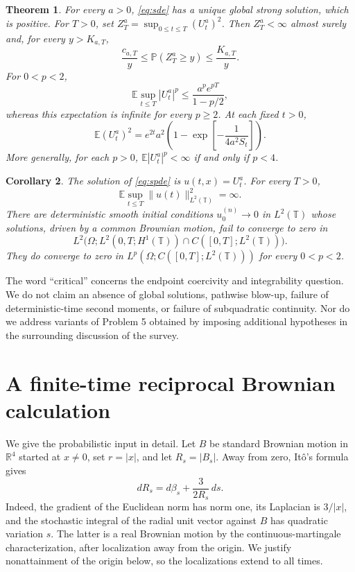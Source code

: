 \documentclass[11pt]{article}
\newtheorem{theorem}{Theorem}[section]
\newtheorem{corollary}[theorem]{Corollary}
\theoremstyle{remark}\newtheorem{remark}[theorem]{Remark}
\newcommand{\E}{\mathbb E}\newcommand{\Pp}{\mathbb P}
\newcommand{\R}{\mathbb R}\newcommand{\T}{\mathbb T}
\begin{document}
\begin{theorem}\label{thm:main}
For every $a>0$, \eqref{eq:sde} has a unique global strong solution, which is positive. For $T>0$, set $Z_T^a=\sup_{0\le t\le T}(U_t^a)^2$. Then $Z_T^a<\infty$ almost surely and, for every $y>K_{a,T}$,
\begin{equation}\label{eq:tail}
 \frac{c_{a,T}}{y}\le \Pp(Z_T^a\ge y)\le \frac{K_{a,T}}{y}.
\end{equation}
For $0<p<2$,
\begin{equation}\label{eq:subcritical}
 \E\sup_{t\le T}|U_t^a|^p\le
 \frac{a^p e^{pT}}{1-p/2},
\end{equation}
whereas this expectation is infinite for every $p\ge2$. At each fixed $t>0$,
\begin{equation}\label{eq:second}
 \E (U_t^a)^2=e^{2t}a^2
 \left(1-\exp\left[-\frac{1}{4a^2S_t}\right]\right).
\end{equation}
More generally, for each $p>0$, $\E|U_t^a|^p<\infty$ if and only if $p<4$.
\end{theorem}

\begin{corollary}\label{cor:spde}
The solution of \eqref{eq:spde} is $u(t,x)=U_t^a$. For every $T>0$,
\[
 \E\sup_{t\le T}\|u(t)\|_{L^2(\T)}^2=\infty.
\]
There are deterministic smooth initial conditions $u_0^{(n)}\to0$ in $L^2(\T)$ whose solutions, driven by a common Brownian motion, fail to converge to zero in
\[
 L^2\bigl(\Omega;L^2(0,T;H^1(\T))\cap C([0,T];L^2(\T))\bigr).
\]
They do converge to zero in $L^p(\Omega;C([0,T];L^2(\T)))$ for every $0<p<2$.
\end{corollary}

The word ``critical'' concerns the endpoint coercivity and integrability question. We do not claim an absence of global solutions, pathwise blow-up, failure of deterministic-time second moments, or failure of subquadratic continuity. Nor do we address variants of Problem 5 obtained by imposing additional hypotheses in the surrounding discussion of the survey.

\section{A finite-time reciprocal Brownian calculation}
We give the probabilistic input in detail. Let $B$ be standard Brownian motion in $\R^4$ started at $x\ne0$, set $r=|x|$, and let $R_s=|B_s|$. Away from zero, It\^o's formula gives
\begin{equation}\label{eq:bessel}
 dR_s=d\beta_s+\frac{3}{2R_s}\,ds.
\end{equation}
Indeed, the gradient of the Euclidean norm has norm one, its Laplacian is $3/|x|$, and the stochastic integral of the radial unit vector against $B$ has quadratic variation $s$. The latter is a real Brownian motion by the continuous-martingale characterization, after localization away from the origin. We justify nonattainment of the origin below, so the localizations extend to all times.
\end{document}
